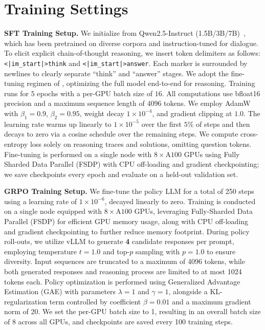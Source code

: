 \section{Training Settings}
\textbf{SFT Training Setup.}
We initialize from Qwen2.5-Instruct (1.5B/3B/7B)~\cite{Qwen2024}, which has been pretrained on diverse corpora and instruction-tuned for dialogue.
To elicit explicit chain-of-thought reasoning, we insert token delimiters as follows:\texttt{<|im\_start|>think} and \texttt{<|im\_start|>answer}.
Each marker is surrounded by newlines to clearly separate “think” and “answer” stages.
We adopt the fine-tuning regimen of \cite{muennighoff2025simple}, optimizing the full model end-to-end for reasoning.
Training runs for $5$ epochs with a per-GPU batch size of $16$.
All computations use bfloat16 precision and a maximum sequence length of $4096$ tokens.
We employ AdamW \cite{loshchilov2019decoupled} with $\beta_{1}=0.9$, $\beta_{2}=0.95$, weight decay $1\times10^{-4}$, and gradient clipping at $1.0$.
The learning rate warms up linearly to $1\times10^{-5}$ over the first $5\%$ of steps and then decays to zero via a cosine schedule over the remaining steps.
We compute cross-entropy loss solely on reasoning traces and solutions, omitting question tokens. Fine-tuning is performed on a single node with $8\times\mathrm{A}100$ GPUs using Fully Sharded Data Parallel (FSDP) with CPU off-loading and gradient checkpointing; we save checkpoints every epoch and evaluate on a held-out validation set.


\textbf{GRPO Training Setup.}
We fine-tune the policy LLM for a total of 250 steps using a learning rate of $1\times10^{-6}$, decayed linearly to zero.
Training is conducted on a single node equipped with $8{\times}\mathrm{A}100$ GPUs, leveraging Fully-Sharded Data Parallel (FSDP) for efficient GPU memory usage, along with CPU off-loading and gradient checkpointing to further reduce memory footprint.
During policy roll-outs, we utilize vLLM to generate \textbf{4} candidate responses per prompt, employing temperature $t=1.0$ and top-$p$ sampling with $p=1.0$ to ensure diversity.
Input sequences are truncated to a maximum of 4096 tokens, while both generated responses and reasoning process are limited to at most 1024 tokens each.
Policy optimization is performed using Generalized Advantage Estimation (GAE) with parameters $\lambda=1$ and $\gamma=1$, alongside a KL-regularization term controlled by coefficient $\beta=0.01$ and a maximum gradient norm of 20.
We set the per-GPU batch size to 1, resulting in an overall batch size of 8 across all GPUs, and checkpoints are saved every 100 training steps.



